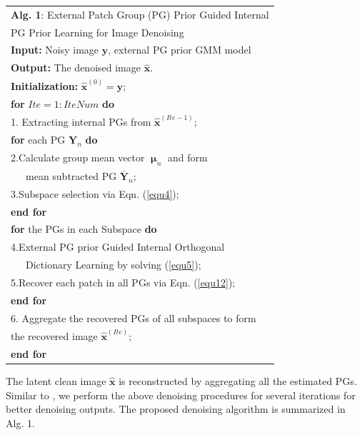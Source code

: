 \documentclass[10pt,twocolumn,letterpaper]{article}
\begin{document}
\begin{table}\label{alg1}
\begin{tabular}{l}
\hline
\textbf{Alg. 1}: External Patch Group (PG) Prior Guided Internal
\\
\quad \quad \quad PG Prior Learning for Image Denoising
\\
\hline
\textbf{Input:} Noisy image $\mathbf{y}$, external PG prior GMM model
\\
\textbf{Output:} The denoised image $\hat{\mathbf{x}}$.
\\
\textbf{Initialization:} $\hat{\mathbf{x}}^{(0)}=\mathbf{y}$;
\\
\textbf{for} $Ite = 1:IteNum$ \textbf{do}
\\
1. Extracting internal PGs from $\hat{\mathbf{x}}^{(Ite-1)}$;
\\
\quad\textbf{for} each PG $\mathbf{Y}_{n}$ \textbf{do}
\\
2.\quad Calculate group mean vector $\boldsymbol{\upmu}_{n}$ and form 
\\
\quad \ \ \ mean subtracted PG $\mathbf{\overline{Y}}_{n}$;
\\
3.\quad Subspace selection via Eqn. (\ref{equ4});
\\
\quad\textbf{end for}
\\
\quad\textbf{for} the PGs in each Subspace \textbf{do}
\\
4.\quad External PG prior Guided Internal Orthogonal
\\
\quad \ \ \ Dictionary Learning by solving (\ref{equ5});
\\
5.\quad Recover each patch in all PGs via Eqn. (\ref{equ12});
\\
\quad\textbf{end for}
\\
6. Aggregate the recovered PGs of all subspaces to form
\\
\quad the recovered image $\hat{\mathbf{x}}^{(Ite)}$;
\\
\textbf{end for}
\\
\hline
\end{tabular}
\end{table}
The latent clean image $\hat{\mathbf{x}}$ is reconstructed by aggregating all the estimated PGs. Similar to \cite{pgpd}, we perform the above denoising procedures for several iterations for better denoising outputs. The proposed denoising algorithm is summarized in Alg. 1.
\end{document}
